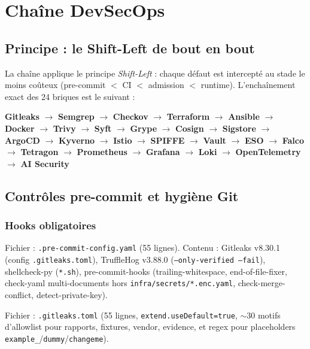 \documentclass[12pt,a4paper,openany]{report}
\begin{document}
\chapter{Chaîne DevSecOps}
\label{ch:devsecops}

\section{Principe : le Shift-Left de bout en bout}

La chaîne applique le principe \textit{Shift-Left} : chaque défaut est intercepté
au stade le moins coûteux (pre-commit $<$ CI $<$ admission $<$ runtime).
L'enchaînement exact des 24 briques est le suivant :

\begin{center}
\small
\textbf{Gitleaks} $\rightarrow$ \textbf{Semgrep} $\rightarrow$ \textbf{Checkov} $\rightarrow$
\textbf{Terraform} $\rightarrow$ \textbf{Ansible} $\rightarrow$ \textbf{Docker} $\rightarrow$
\textbf{Trivy} $\rightarrow$ \textbf{Syft} $\rightarrow$ \textbf{Grype} $\rightarrow$
\textbf{Cosign} $\rightarrow$ \textbf{Sigstore} $\rightarrow$ \textbf{ArgoCD} $\rightarrow$
\textbf{Kyverno} $\rightarrow$ \textbf{Istio} $\rightarrow$ \textbf{SPIFFE} $\rightarrow$
\textbf{Vault} $\rightarrow$ \textbf{ESO} $\rightarrow$ \textbf{Falco} $\rightarrow$
\textbf{Tetragon} $\rightarrow$ \textbf{Prometheus} $\rightarrow$ \textbf{Grafana} $\rightarrow$
\textbf{Loki} $\rightarrow$ \textbf{OpenTelemetry} $\rightarrow$ \textbf{AI Security}
\end{center}

\section{Contrôles pre-commit et hygiène Git}

\subsection{Hooks obligatoires}

Fichier : \texttt{.pre-commit-config.yaml} (55 lignes).
Contenu : Gitleaks v8.30.1 (config \texttt{.gitleaks.toml}), TruffleHog v3.88.0
(\texttt{--only-verified --fail}), shellcheck-py (\texttt{*.sh}), pre-commit-hooks
(trailing-whitespace, end-of-file-fixer, check-yaml multi-documents hors
\texttt{infra/secrets/*.enc.yaml}, check-merge-conflict, detect-private-key).

Fichier : \texttt{.gitleaks.toml} (55 lignes, \texttt{extend.useDefault=true},
$\sim$30 motifs d'allowlist pour rapports, fixtures, vendor, evidence, et regex
pour placeholders \texttt{example\_}/\texttt{dummy}/\texttt{changeme}).
\end{document}
